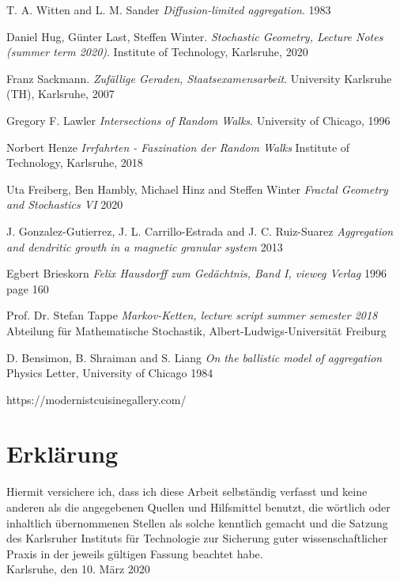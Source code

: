 \documentclass[12pt,a4paper]{scrartcl}
\numberwithin{equation}{subsection}
\newcommand{\1}{\mathbbm{1}}
\numberwithin{equation}{section}
\theoremstyle{definition}
\begin{document}
\newpage

\begin{thebibliography}{biblio}
\thispagestyle{empty}

T. A. Witten and L. M. Sander
\emph{Diffusion-limited aggregation}.
1983

Daniel Hug, Günter Last, Steffen Winter.
\emph{Stochastic Geometry, 	Lecture Notes (summer term 2020)}.
Institute of Technology, Karlsruhe, 2020

Franz Sackmann. 
\emph{Zufällige Geraden, Staatsexamensarbeit}.
University Karlsruhe (TH), Karlsruhe, 2007

Gregory F. Lawler
\emph{Intersections of Random Walks}.
University of Chicago, 1996

Norbert Henze
\emph{Irrfahrten - Faszination der Random Walks}
Institute of Technology, Karlsruhe, 2018

Uta Freiberg, Ben Hambly, Michael Hinz and Steffen Winter
\emph{Fractal Geometry and Stochastics VI}
2020

J. Gonzalez-Gutierrez, J. L. Carrillo-Estrada and J. C. Ruiz-Suarez
\emph{Aggregation and dendritic growth in a magnetic granular system}
2013

Egbert Brieskorn
\emph{Felix Hausdorff zum Gedächtnis, Band I, vieweg Verlag}
1996
page 160

Prof. Dr. Stefan Tappe
\emph{Markov-Ketten, lecture script summer semester 2018}
Abteilung für Mathematische Stochastik, Albert-Ludwigs-Universität Freiburg

D. Bensimon, B. Shraiman and S. Liang
\emph{On the ballistic model of aggregation}
Physics Letter, University of Chicago
1984

https://modernistcuisinegallery.com/


\end{thebibliography}

\newpage
  
\thispagestyle{empty}

\vspace*{8cm}


\section*{Erklärung}

Hiermit versichere ich, dass ich diese Arbeit selbständig verfasst und keine anderen als die angegebenen Quellen und Hilfsmittel benutzt, die wörtlich oder inhaltlich übernommenen Stellen als solche kenntlich gemacht und die Satzung des Karlsruher Instituts für Technologie zur Sicherung guter wissenschaftlicher Praxis in der jeweils gültigen Fassung beachtet habe. \\[2ex] 

\noindent
Karlsruhe, den 10. März 2020\\[5ex] 
\end{document}

